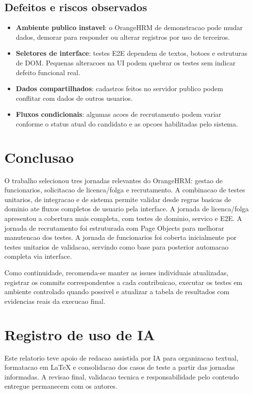 \documentclass[12pt,a4paper]{article}
\begin{document}
\subsection{Defeitos e riscos observados}

\begin{itemize}
    \item \textbf{Ambiente publico instavel}: o OrangeHRM de demonstracao pode mudar dados, demorar para responder ou alterar registros por uso de terceiros.
    \item \textbf{Seletores de interface}: testes E2E dependem de textos, botoes e estruturas de DOM. Pequenas alteracoes na UI podem quebrar os testes sem indicar defeito funcional real.
    \item \textbf{Dados compartilhados}: cadastros feitos no servidor publico podem conflitar com dados de outros usuarios.
    \item \textbf{Fluxos condicionais}: algumas acoes de recrutamento podem variar conforme o status atual do candidato e as opcoes habilitadas pelo sistema.
\end{itemize}

\newpage
\section{Conclusao}

O trabalho selecionou tres jornadas relevantes do OrangeHRM: gestao de funcionarios, solicitacao de licenca/folga e recrutamento. A combinacao de testes unitarios, de integracao e de sistema permite validar desde regras basicas de dominio ate fluxos completos de usuario pela interface. A jornada de licenca/folga apresentou a cobertura mais completa, com testes de dominio, servico e E2E. A jornada de recrutamento foi estruturada com Page Objects para melhorar manutencao dos testes. A jornada de funcionarios foi coberta inicialmente por testes unitarios de validacao, servindo como base para posterior automacao completa via interface.

Como continuidade, recomenda-se manter as issues individuais atualizadas, registrar os commits correspondentes a cada contribuicao, executar os testes em ambiente controlado quando possivel e atualizar a tabela de resultados com evidencias reais da execucao final.

\section*{Registro de uso de IA}

Este relatorio teve apoio de redacao assistida por IA para organizacao textual, formatacao em \LaTeX{} e consolidacao dos casos de teste a partir das jornadas informadas. A revisao final, validacao tecnica e responsabilidade pelo conteudo entregue permanecem com os autores.
\end{document}
